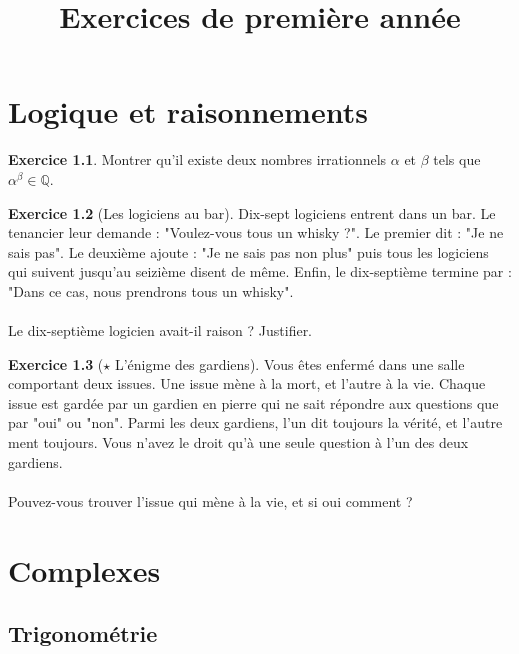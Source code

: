 \documentclass[french]{book}
\title{Exercices de première année}
\newcommand{\Q}{\mathbb{Q}}
\theoremstyle{definition}
\newtheorem{ex}{Exercice}[chapter]
\theoremstyle{theorem}
\theoremstyle{remark}
\begin{document}
\maketitle
\tableofcontents
\chapter{Logique et raisonnements}

\begin{ex}
	Montrer qu'il existe deux nombres irrationnels $\alpha$ et $\beta$ tels que $\alpha^{\beta} \in \Q$.
\end{ex}

\begin{ex}[Les logiciens au bar]
	Dix-sept logiciens entrent dans un bar. Le tenancier leur demande : "Voulez-vous tous un whisky ?". Le premier dit : "Je ne sais pas". Le deuxième ajoute : "Je ne sais pas non plus" puis tous les logiciens qui suivent jusqu'au seizième disent de même. Enfin, le dix-septième termine par : "Dans ce cas, nous prendrons tous un whisky". \\ \\
	Le dix-septième logicien avait-il raison ? Justifier.
\end{ex}

\begin{ex}[$\star$ L'énigme des gardiens]
	Vous êtes enfermé dans une salle comportant deux issues. Une issue mène à la mort, et l'autre à la vie. Chaque issue est gardée par un gardien en pierre qui ne sait répondre aux questions que par "oui" ou "non". Parmi les deux gardiens, l'un dit toujours la vérité, et l'autre ment toujours. Vous n'avez le droit qu'à une seule question à l'un des deux gardiens.\\ \\ Pouvez-vous trouver l'issue qui mène à la vie, et si oui comment ?
\end{ex}

\chapter{Complexes}

\section{Trigonométrie}
\end{document}
